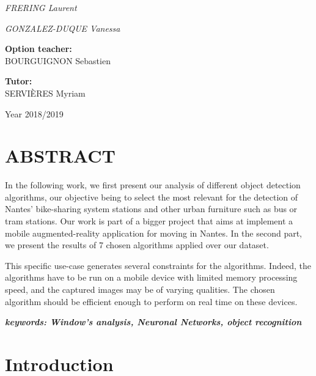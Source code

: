 \documentclass[10pt]{article}
\begin{document}
\begin{titlepage}
        {\Large\itshape FRERING Laurent  \par}
        {\Large\itshape GONZALEZ-DUQUE Vanessa  \par}
        \vfill
        \begin{minipage}[t]{0.5\textwidth}%
            \centering
            {\bfseries Option teacher:}\\
            {BOURGUIGNON Sebastien}
        \end{minipage}%
        \begin{minipage}[t]{0.5\textwidth}%
            \centering
            {\bfseries Tutor:}\\
            {SERVIÈRES Myriam}
        \end{minipage}%
        \vspace{2cm}
        {Year 2018/2019}
    \end{titlepage}
    

    \newpage
    
    \section*{ABSTRACT}
    
    In the following work, we first present our analysis of different object detection algorithms, our objective being to select the most relevant for the detection of Nantes' bike-sharing system stations and other urban furniture such as bus or tram stations. Our work is part of a bigger project that aims at implement a mobile augmented-reality application for moving in Nantes. In the second part, we present the results of 7 chosen algorithms applied over our dataset. 
    
    This specific use-case generates several constraints for the algorithms. Indeed, the algorithms have to be run on a mobile device with limited memory processing speed, and the captured images may be of varying qualities. The chosen algorithm should be efficient enough to perform on real time on these devices. \newline
    
    {\itshape \bfseries keywords: Window's analysis, Neuronal Networks, object recognition} 
    \newpage
    
    
    
    \tableofcontents
    
    \newpage
    \section*{Introduction}
\end{document}
